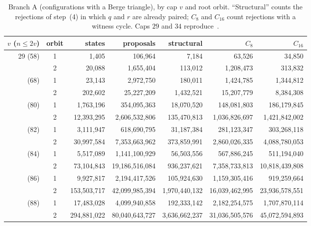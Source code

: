\documentclass[11pt]{amsart}
\theoremstyle{definition}
\theoremstyle{remark}
\begin{document}
\begin{table}[ht]
\centering
\small
\caption{Branch A (configurations with a Berge triangle), by cap $v$ and root
orbit. ``Structural'' counts the rejections of step~(4) in which $q$ and $r$
are already paired; $C_8$ and $C_{16}$ count rejections with a witness cycle. Caps $29$ and $34$ reproduce~\cite{Tranquilli2026,Zhuge2026}.}
\label{tab:branchA}
\begin{tabular}{@{}rcrrrrr@{}}
\toprule
$v$ ($n\le 2v$) & orbit & states & proposals & structural & $C_8$ & $C_{16}$\\
\midrule
29 (58) & 1 & 1{,}405 & 106{,}964 & 7{,}184 & 63{,}526 & 34{,}850\\
        & 2 & 20{,}088 & 1{,}655{,}404 & 113{,}012 & 1{,}208{,}473 & 313{,}832\\
\addlinespace
34 (68) & 1 & 23{,}143 & 2{,}972{,}750 & 180{,}011 & 1{,}424{,}785 & 1{,}344{,}812\\
        & 2 & 202{,}602 & 25{,}227{,}209 & 1{,}432{,}521 & 15{,}207{,}779 & 8{,}384{,}308\\
\addlinespace
40 (80) & 1 & 1{,}763{,}196 & 354{,}095{,}363 & 18{,}070{,}520 & 148{,}081{,}803 & 186{,}179{,}845\\
        & 2 & 12{,}393{,}295 & 2{,}606{,}532{,}806 & 135{,}470{,}813 & 1{,}036{,}826{,}697 & 1{,}421{,}842{,}002\\
\addlinespace
41 (82) & 1 & 3{,}111{,}947 & 618{,}690{,}795 & 31{,}187{,}384 & 281{,}123{,}347 & 303{,}268{,}118\\
        & 2 & 30{,}997{,}584 & 7{,}353{,}663{,}962 & 373{,}859{,}991 & 2{,}860{,}026{,}335 & 4{,}088{,}780{,}053\\
\addlinespace
42 (84) & 1 & 5{,}517{,}089 & 1{,}141{,}100{,}929 & 56{,}503{,}556 & 567{,}886{,}245 & 511{,}194{,}040\\
        & 2 & 73{,}104{,}843 & 19{,}186{,}516{,}084 & 936{,}237{,}621 & 7{,}358{,}733{,}813 & 10{,}818{,}439{,}808\\
\addlinespace
43 (86) & 1 & 9{,}927{,}817 & 2{,}194{,}417{,}526 & 105{,}924{,}630 & 1{,}159{,}305{,}416 & 919{,}259{,}664\\
        & 2 & 153{,}503{,}717 & 42{,}099{,}985{,}394 & 1{,}970{,}440{,}132 & 16{,}039{,}462{,}995 & 23{,}936{,}578{,}551\\
\addlinespace
44 (88) & 1 & 17{,}483{,}028 & 4{,}099{,}940{,}858 & 192{,}333{,}142 & 2{,}182{,}254{,}575 & 1{,}707{,}870{,}114\\
        & 2 & 294{,}881{,}022 & 80{,}040{,}643{,}727 & 3{,}636{,}662{,}237 & 31{,}036{,}505{,}576 & 45{,}072{,}594{,}893\\
\bottomrule
\end{tabular}
\end{table}
\end{document}
